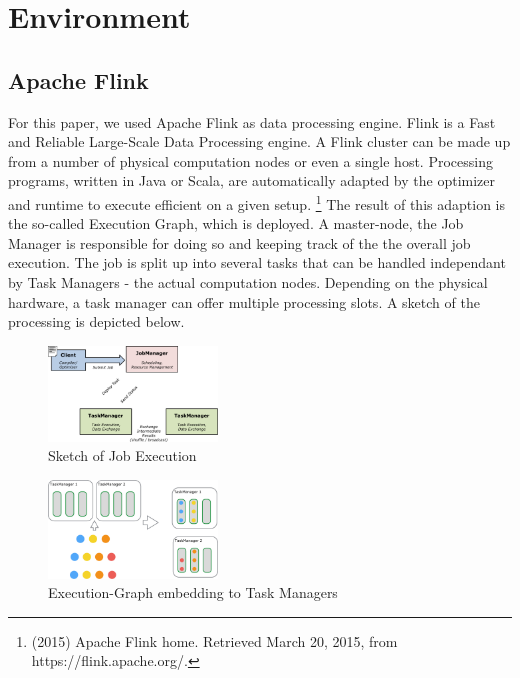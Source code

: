 \section{Environment}
\subsection{Apache Flink}
For this paper, we used Apache Flink as data processing engine. Flink is a Fast and Reliable
Large-Scale Data Processing engine. A Flink cluster can be made up from a number of physical
computation nodes or even a single host. Processing programs, written in Java or Scala, are
automatically adapted by the optimizer and runtime to execute efficient on a given setup.
\footnote{(2015) Apache Flink home. Retrieved March 20, 2015, from https://flink.apache.org/.}
The result of this adaption is the so-called Execution Graph, which is deployed. A master-node, the
Job Manager is responsible for doing so and keeping track of the the overall job execution. The job
is split up into several tasks that can be handled independant by Task Managers - the actual
computation nodes.  Depending on the physical hardware, a task manager can offer multiple processing
slots. A sketch of the processing is depicted below.

\begin{figure}[h]
    \centering
    \includegraphics[width=0.4\textwidth]{graphics/ClientJmTm.pdf}
    \caption{Sketch of Job Execution\protect\footnotemark}
    \label{fig:jobexecution}
\end{figure}

\begin{figure}[h]
    \centering
    \includegraphics[width=0.4\textwidth]{graphics/slots.pdf}
    \caption{Execution-Graph embedding to Task Managers\protect\footnotemark}
    \label{fig:embedding}
\end{figure}


